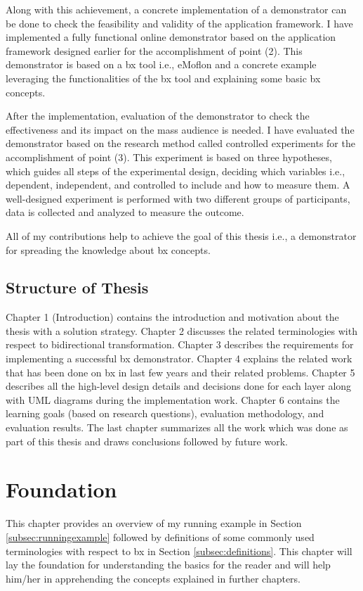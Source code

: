 Along with this achievement, a concrete implementation of a demonstrator can be done to check the feasibility and validity of the application framework. I have implemented a fully functional online demonstrator based on the application framework designed earlier for the accomplishment of point (2). This demonstrator is based on a bx tool i.e., eMoflon and a concrete example leveraging the functionalities of the bx tool and explaining some basic bx concepts. 

After the implementation, evaluation of the demonstrator to check the effectiveness and its impact on the mass audience is needed. I have evaluated the demonstrator based on the research method called controlled experiments \cite{semethods} for the accomplishment of point (3). This experiment is based on three hypotheses, which guides all steps of the experimental design, deciding which variables i.e., dependent, independent, and controlled to include and how to measure them. A well-designed experiment is performed with two different groups of participants, data is collected and analyzed to measure the outcome.

All of my contributions help to achieve the goal of this thesis i.e., a demonstrator for spreading the knowledge about bx concepts.

\subsection{Structure of Thesis}\label{subsec:structure}

Chapter 1 (Introduction) contains the introduction and motivation about the thesis with a solution strategy. Chapter 2 discusses the related terminologies with respect to bidirectional transformation. Chapter 3 describes the requirements for implementing a successful bx demonstrator. Chapter 4 explains the related work that has been done on bx in last few years and their related problems. Chapter 5 describes all the high-level design details and decisions done for each layer along with UML diagrams during the implementation work. Chapter 6 contains the learning goals (based on research questions), evaluation methodology, and evaluation results. The last chapter summarizes all the work which was done as part of this thesis and draws conclusions followed by future work.

\clearpage
\section{Foundation}\label{sec:foundation}
This chapter provides an overview of my running example in Section \ref{subsec:runningexample} followed by definitions of some commonly used terminologies with respect to bx in Section \ref{subsec:definitions}. This chapter will lay the foundation for understanding the basics for the reader and will help him/her in apprehending the concepts explained in further chapters.

